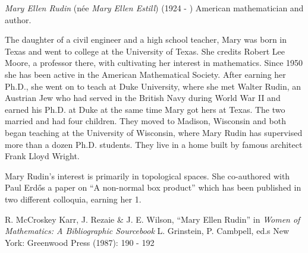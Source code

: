 \documentclass[12pt]{article}
\begin{document}

\emph{Mary Ellen Rudin} (n\'ee \emph{Mary Ellen Estill}) (1924 - ) American mathematician and author.

The daughter of a civil engineer and a high school teacher, Mary was born in Texas and went to college at the University of Texas. She credits Robert Lee Moore, a professor there, with cultivating her interest in mathematics. Since 1950 she has been active in the American Mathematical Society. After earning her Ph.D., she went on to teach at Duke University, where she met Walter Rudin, an Austrian Jew who had served in the British Navy during World War II and earned his Ph.D. at Duke at the same time Mary got hers at Texas. The two married and had four children. They moved to Madison, Wisconsin and both began teaching at the University of Wisconsin, where Mary Rudin has supervised more than a dozen Ph.D. students. They live in a home built by famous architect Frank Lloyd Wright.

Mary Rudin's interest is primarily in topological spaces. She co-authored with Paul Erd\H{o}s a paper on ``A non-normal box product'' which has been published in two different colloquia, earning her  1.

\begin{thebibliography}{1}
 R. McCroskey Karr, J. Rezaie \& J. E. Wilson, ``Mary Ellen Rudin'' in {\it Women of Mathematics: A Bibliographic Sourcebook} L. Grinstein, P. Cambpell, ed.s New York: Greenwood Press (1987): 190 - 192
\end{thebibliography}
\end{document}

